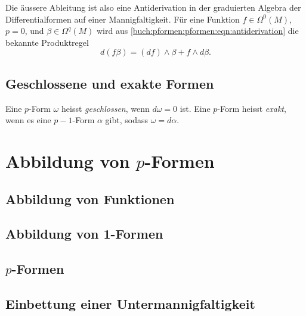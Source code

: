 Die äussere Ableitung ist also eine Antiderivation in der graduierten
Algebra der Differentialformen auf einer Mannigfaltigkeit.
Für eine Funktion $f\in\Omega^0(M)$, $p=0$, und $\beta\in\Omega^q(M)$ 
wird aus
\eqref{buch:pformen:pformen:eqn:antiderivation}
die bekannte Produktregel
\[
d(f\beta)
=
(df)\wedge \beta
+
f\wedge d\beta.
\]

\subsection{Geschlossene und exakte Formen}

\begin{definition}
Eine $p$-Form $\omega$ heisst {\em geschlossen}, wenn $d\omega=0$ ist.
%
Eine $p$-Form heisst {\em exakt}, wenn es eine $p-1$-Form $\alpha$ gibt,
sodass $\omega = d\alpha$.
%
\end{definition}


%
%
\section{Abbildung von $p$-Formen
\label{buch:pformen:section:abbildung}}
%

\subsection{Abbildung von Funktionen}
% 

\subsection{Abbildung von 1-Formen}

\subsection{$p$-Formen}

\subsection{Einbettung einer Untermannigfaltigkeit}

%
%
